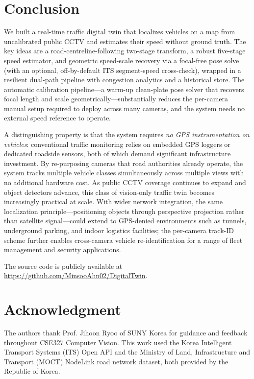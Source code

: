 \documentclass[conference]{IEEEtran}
\renewcommand{\_}{\textunderscore\allowbreak}
\begin{document}
\section{Conclusion}\label{sec:concl}
We built a real-time traffic digital twin that localizes vehicles on a map from
uncalibrated public CCTV and estimates their speed without ground truth. The key
ideas are a road-centreline-following two-stage transform, a robust five-stage speed
estimator, and geometric speed-scale recovery via a focal-free pose solve (with an
optional, off-by-default ITS segment-speed cross-check), wrapped in a resilient dual-path
pipeline with congestion analytics and a historical store. The automatic calibration
pipeline---a warm-up clean-plate pose solver that recovers focal length and scale
geometrically---substantially reduces the per-camera manual setup required to deploy across
many cameras, and the system needs no external speed reference to operate.

A distinguishing property is that the system requires \emph{no GPS instrumentation
on vehicles}: conventional traffic monitoring relies on embedded GPS loggers or
dedicated roadside sensors, both of which demand significant infrastructure
investment. By re-purposing cameras that road authorities already operate, the
system tracks multiple vehicle classes simultaneously across multiple views with no
additional hardware cost. As public CCTV coverage continues to expand and object
detectors advance, this class of vision-only traffic twin becomes increasingly
practical at scale. With wider network integration, the same localization
principle---positioning objects through perspective projection rather than satellite
signal---could extend to GPS-denied environments such as tunnels, underground
parking, and indoor logistics facilities; the per-camera track-ID scheme further
enables cross-camera vehicle re-identification for a range of fleet management and
security applications.

The source code is publicly available at \url{https://github.com/MinsooAhn02/DigitalTwin}.

\section*{Acknowledgment}
The authors thank Prof. Jihoon Ryoo of SUNY Korea for guidance and feedback
throughout CSE327 Computer Vision. This work used the Korea Intelligent
Transport Systems (ITS) Open API and the Ministry of Land, Infrastructure and
Transport (MOCT) NodeLink road network dataset, both provided by the Republic
of Korea.



\end{document}
